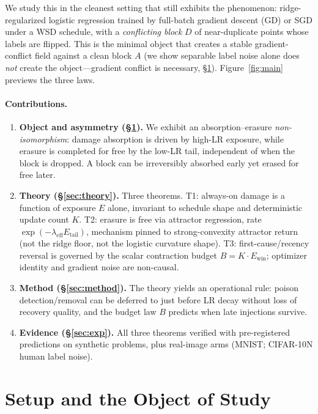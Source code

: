 \documentclass{article}
\newcommand{\Expo}{E}         %
\newcommand{\Ewin}{E_{\mathrm{win}}}
\newcommand{\B}{B}            %
\newcommand{\lam}{\lambda}
\newcommand{\lameff}{\lam_{\mathrm{eff}}}
\begin{document}
We study this in the cleanest setting that still exhibits the phenomenon: ridge-regularized
logistic regression trained by full-batch gradient descent (GD) or SGD under a WSD schedule,
with a \emph{conflicting block} $D$ of near-duplicate points whose labels are flipped. This
is the minimal object that creates a stable gradient-conflict field against a clean block $A$
(we show separable label noise alone does \emph{not} create the object---gradient conflict is
necessary, \S\ref{sec:object}). Figure~\ref{fig:main} previews the three laws.

\paragraph{Contributions.}
\begin{enumerate}
\item \textbf{Object and asymmetry (\S\ref{sec:object}).} We exhibit an
absorption--erasure \emph{non-isomorphism}: damage absorption is driven by high-LR exposure,
while erasure is completed for free by the low-LR tail, independent of when the block is
dropped. A block can be irreversibly absorbed early yet erased for free later.
\item \textbf{Theory (\S\ref{sec:theory}).} Three theorems. T1: always-on damage is a
function of exposure $\Expo$ alone, invariant to schedule shape and deterministic update count
$K$. T2: erasure is free via attractor regression, rate $\exp(-\lameff E_{\mathrm{tail}})$,
mechanism pinned to strong-convexity attractor return (not the ridge floor, not the logistic
curvature shape). T3: first-cause/recency reversal is governed by the scalar contraction
budget $\B=K\cdot\Ewin$; optimizer identity and gradient noise are non-causal.
\item \textbf{Method (\S\ref{sec:method}).} The theory yields an operational rule: poison
detection/removal can be deferred to just before LR decay without loss of recovery quality,
and the budget law $\B$ predicts when late injections survive.
\item \textbf{Evidence (\S\ref{sec:exp}).} All three theorems verified with pre-registered
predictions on synthetic problems, plus real-image arms (MNIST; CIFAR-10N human label noise).
\end{enumerate}

\section{Setup and the Object of Study}
\label{sec:object}
\end{document}
